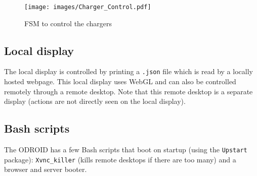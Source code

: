 \begin{figure}[!ht]
  \centering
    \texttt{[image: images/Charger\_Control.pdf]}
      \caption{FSM to control the chargers}\label{fig:fsm}
\end{figure}

\subsection{Local display}
The local display is controlled by printing a \verb|.json| file which is read by a locally hosted webpage. This local display uses WebGL and can also be controlled remotely through a remote desktop. Note that this remote desktop is a separate display (actions are not directly seen on the local display).\\

\subsection{Bash scripts}
The ODROID has a few Bash scripts that boot on startup (using the \verb|Upstart| package): \verb|Xvnc_killer| (kills remote desktops if there are too many) and a browser and server booter.
